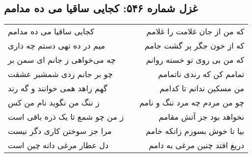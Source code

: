 \begin{center}
\section*{غزل شماره ۵۴۶: کجایی ساقیا می ده مدامم}
\label{sec:546}
\begin{longtable}{l p{0.5cm} r}
کجایی ساقیا می ده مدامم
&&
که من از جان غلامت را غلامم
\\
میم در ده تهی دستم چه داری
&&
که از خون جگر پر گشت جامم
\\
چه می‌خواهی ز جانم ای سمن بر
&&
که من بی روی تو خسته روانم
\\
چو بر جانم زدی شمشیر عشقت
&&
تمامم کن که رندی ناتمامم
\\
گهم زاهد همی خوانند و گه رند
&&
من مسکین ندانم تا کدامم
\\
ز ننگ من نگوید نام من کس
&&
چو من مردم چه مرد ننگ و نامم
\\
ز من چو شمع تا یک ذره باقی است
&&
نخواهد بود جز آتش مقامم
\\
مرا جز سوختن کاری دگر نیست
&&
بیا تا خوش بسوزم زانکه خامم
\\
دل عطار مرغی دانه چین است
&&
دریغ افتد چنین مرغی به دامم
\\
\end{longtable}
\end{center}
